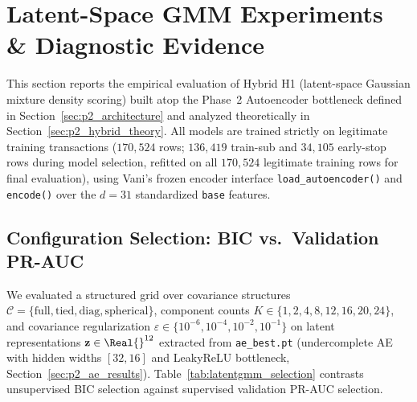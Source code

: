 \section{Latent-Space GMM Experiments \& Diagnostic Evidence}
\label{sec:p2_latent_gmm_results}

This section reports the empirical evaluation of Hybrid H1 (latent-space Gaussian mixture density scoring) built atop the Phase~2 Autoencoder bottleneck defined in Section~\ref{sec:p2_architecture} and analyzed theoretically in Section~\ref{sec:p2_hybrid_theory}. All models are trained strictly on legitimate training transactions ($170{,}524$ rows; $136{,}419$ train-sub and $34{,}105$ early-stop rows during model selection, refitted on all $170{,}524$ legitimate training rows for final evaluation), using Vani's frozen encoder interface \texttt{load\_autoencoder()} and \texttt{encode()} over the $d=31$ standardized \texttt{base} features.

\subsection{Configuration Selection: BIC vs.\ Validation PR-AUC}
\label{subsec:latentgmm_selection}

We evaluated a structured grid over covariance structures $\mathcal{C} = \{\mathrm{full}, \mathrm{tied}, \mathrm{diag}, \mathrm{spherical}\}$, component counts $K \in \{1, 2, 4, 8, 12, 16, 20, 24\}$, and covariance regularization $\varepsilon \in \{10^{-6}, 10^{-4}, 10^{-2}, 10^{-1}\}$ on latent representations $\mathbf{z} \in \Real{}^{12}$ extracted from \texttt{ae\_best.pt} (undercomplete AE with hidden widths $[32, 16]$ and LeakyReLU bottleneck, Section~\ref{sec:p2_ae_results}). Table~\ref{tab:latentgmm_selection} contrasts unsupervised BIC selection \cite{schwarz1978estimating,akaike1974new} against supervised validation PR-AUC selection.

\begin{table}[!t]
\centering
\caption{Latent-GMM configuration selection using the standard AE ($d_z=12$)}
\label{tab:latentgmm_selection}
\end{table}


